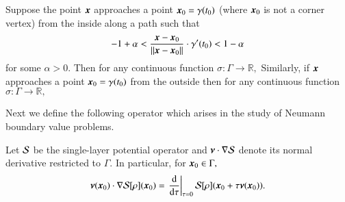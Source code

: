 \begin{theorem}\label{thm:potlim}
Suppose the point $\boldsymbol{x}$ approaches a point $\boldsymbol{x}_0 = \gamma(t_0)$ (where $\boldsymbol{x}_{0}$ is not a corner vertex) from the inside along a path such that 
\begin{align}
-1+\alpha<\frac{\boldsymbol{x}-\boldsymbol{x}_0}{\|\boldsymbol{x}-\boldsymbol{x}_0\|} \cdot \gamma'(t_0) <1-\alpha
\end{align}
for some $\alpha >0.$ Then for any continuous function $\sigma:\Gamma \to \mathbb{R},$
 Similarly, if $\boldsymbol{x}$ approaches a point $\boldsymbol{x}_0 = \gamma(t_0)$ from the outside then for any continuous function $\sigma:\Gamma \to \mathbb{R},$
\end{theorem}

Next we define the following operator which arises in the study of Neumann boundary value problems.
\begin{definition}\label{def_singder}
Let $\mathcal{S}$ be the single-layer potential operator and $\boldsymbol{\nu}\cdot \nabla \mathcal{S}$  denote its normal derivative restricted to $\Gamma.$ In particular, for $\boldsymbol{x}_0 \in \Gamma,$
\begin{align}
\boldsymbol{\nu}(\boldsymbol{x}_0)\cdot \nabla \mathcal{S}[\rho] (\boldsymbol{x}_0) = \left.\frac{{\rm d}}{{\rm d}\tau}\right|_{\tau = 0} \mathcal{S}[\rho](\boldsymbol{x}_0 + \tau \boldsymbol{\nu}(\boldsymbol{x}_0)).
\end{align}
\end{definition}

